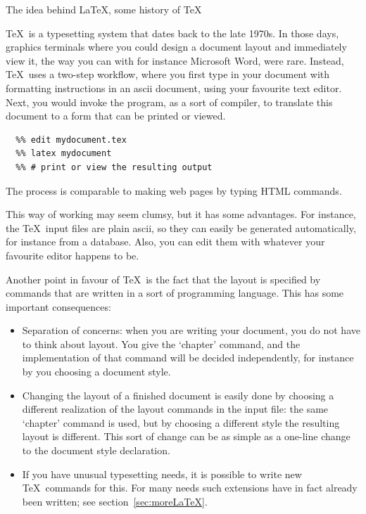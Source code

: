 
 {The idea behind \LaTeX, some history of \TeX}

\TeX\ is a typesetting system that dates back to the late 1970s. In
those days, graphics terminals where you could design a document layout
and immediately view it, the way you can with for instance Microsoft Word, were
rare.  Instead, \TeX\ uses a two-step workflow, where you first type
in your document with formatting instructions in an ascii document,
using your favourite text editor.
%
Next, you would invoke the
 program, as a sort of compiler, to translate this document to
a form that can be printed or viewed. 
\begin{verbatim}
  %% edit mydocument.tex
  %% latex mydocument
  %% # print or view the resulting output
\end{verbatim}
The process is comparable to
making web pages by typing HTML commands.

This way of working may seem clumsy, but
it has some advantages. For instance, the \TeX\ input files are plain
ascii, so they can easily be generated automatically, for instance
from a database. Also, you can edit them with whatever your
favourite editor happens to be.

Another point in favour of \TeX\ is the fact that the layout is
specified by commands that are written in a sort of programming
language. This has some important consequences:
\begin{itemize}
\item Separation of concerns: when you are writing your document, you
  do not have to think about layout. You give the `chapter' command,
  and the implementation of that command will be decided
  independently, for instance by you choosing a document style.
\item Changing the layout of a finished document is easily done by
  choosing a different realization of the layout commands in the input file:
  the same `chapter' command is used, but by choosing a different
  style the resulting layout is
  different. This sort of change can be as simple as 
  a one-line change to the document style declaration.
\item If you have unusual typesetting needs, it is possible to write
  new \TeX\ commands for this. For many needs such extensions have in
  fact already been written; see section~\ref{sec:moreLaTeX}.
\end{itemize}

